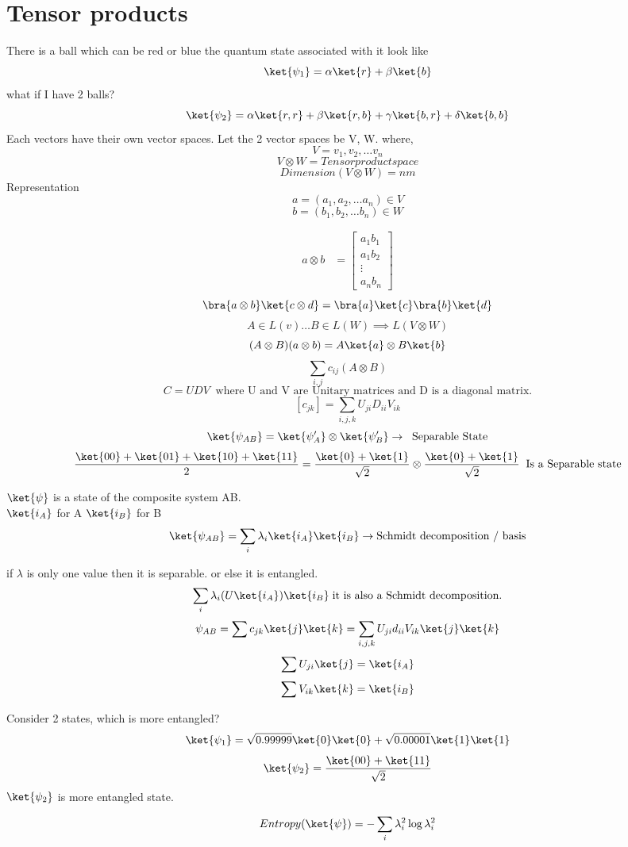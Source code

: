 \chapter{Tensor products}
There is a ball which can be red or blue the quantum state associated with it look like 
\[
     \ket{\psi_1} = \alpha\ket{r} + \beta\ket{b}
\]
what if I have 2 balls?
\[
    \ket{\psi_2} = \alpha\ket{r,r} + \beta\ket{r,b} + \gamma\ket{b,r} + \delta\ket{b,b}
\]
Each vectors have their own vector spaces. Let the 2 vector spaces be V, W. 
where, 
\[
    V = {v_1,v_2, \ldots  v_n}
\]
\[
    V \otimes W = Tensor product space
\]
\[
    Dimension(V\otimes W) = nm
\]
Representation 
\[
    a = (a_1, a_2, \ldots  a_n) \in V
\]
\[
    b = (b_1, b_2, \ldots  b_n) \in W
\]

\begin{align}
    a\otimes b &= \begin{bmatrix}
           a_{1}b_1 \\
           a_{1}b_2 \\
           \vdots \\
           a_{n}b_n 
         \end{bmatrix}
\end{align}
\[
    \bra{a\otimes b}\ket{c \otimes d} = \bra{a}\ket{c}\bra{b}\ket{d}
\]
\[
    A \in L(v) \ldots  B\in L(W) \implies L(V\otimes W)
\]
\[
    (A \otimes B)(a \otimes b) = A \ket{a} \otimes B \ket{b}
\]
\[
    \sum\limits_{i,j}c_{ij}(A\otimes B) 
\]
\[
    \boxed{ C = UDV} \; \; \text{where U and V are Unitary matrices and D is a diagonal matrix.}
\]
\[
    [c_{jk}] = \sum\limits_{i,j,k} U_{ji} D_{ii}V_{ik} 
\]
\newpage
\[
    \ket{\psi_{AB} } = \ket{\psi^\prime _A}\otimes \ket{\psi^\prime _B} \to \;\;\text{Separable State}
\]
\[
    \frac{\ket{00}+\ket{01}+\ket{10}+\ket{11}}{2} = \frac{\ket{0}+\ket{1}}{\sqrt{2} }\otimes  \frac{\ket{0}+\ket{1}}{\sqrt{2} }\; \; \text{Is a Separable state}
\]

$\ket{\psi}$ is a state of the composite system AB. \\
\(\ket{i_A}\) for A \(\ket{i_B}\) for B
\[
    \ket{\psi_{AB} } = \sum\limits_{i} \lambda_i \ket{i_A}\ket{i_B} \to \text{Schmidt decomposition / basis} 
\]

if \(\lambda \) is only one value then it is separable. or else it is entangled. 
\[
    \sum\limits_{i}\lambda_i (U\ket{i_A})\ket{i_B} \; \text{it is also a Schmidt decomposition.}
\]
\[
    \psi_{AB} = \sum c_{jk} \ket{j} \ket{k}  = \sum\limits_{i,j,k} U_{ji}d_{ii}V_{ik} \ket{j}\ket{k}
\]
\[
    \sum U_{ji}\ket{j}  = \ket{i_A}
\]
\[
    \sum V_{ik} \ket{k} = \ket{i_B}
\]
\begin{eg}
    Consider 2 states, which is more entangled?
    \[
        \ket{\psi_1} = \sqrt{0.99999} \ket{0}\ket{0}+\sqrt{0.00001} \ket{1}\ket{1}
    \]
    \[
        \ket{\psi_{2}} = \frac{\ket{00}+\ket{11}}{\sqrt{2} }
    \]
    \(\ket{\psi_2}\) is more entangled state. 
     
\end{eg}
\vspace{4pt}
\[
    Entropy(\ket{\psi}) = -\sum\limits_{i} \lambda^2_i \log \lambda^2_i
\]
